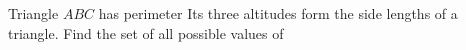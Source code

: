 Triangle $ABC$ has perimeter   Its three altitudes form the side lengths of a triangle.  Find the set of all possible values of 